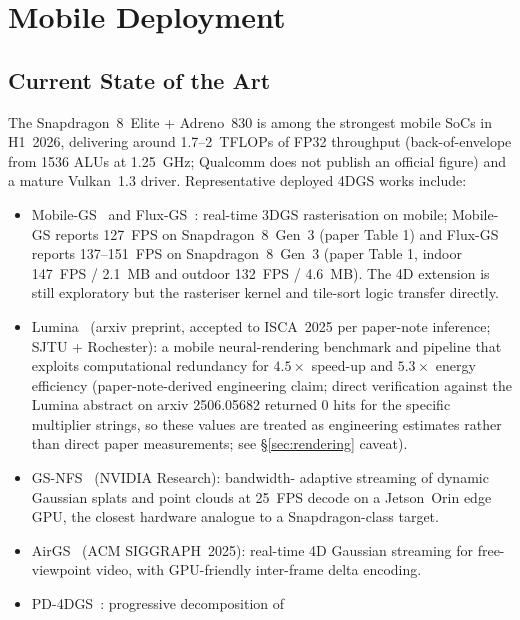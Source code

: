 
\section{Mobile Deployment}
\label{sec:mobile}

\subsection{Current State of the Art}
The Snapdragon~8~Elite + Adreno~830 is among the strongest mobile
SoCs in H1~2026, delivering around 1.7--2~TFLOPs of FP32
throughput (back-of-envelope from 1536 ALUs at 1.25~GHz;
Qualcomm does not publish an official figure) and a mature
Vulkan~1.3 driver. Representative deployed
4DGS works include:
\begin{itemize}
  \item Mobile-GS~\cite{du2026mobilegs} and Flux-GS~\cite{du2026fluxgs}:
        real-time 3DGS rasterisation on mobile; Mobile-GS reports
        127~FPS on Snapdragon~8~Gen~3 (paper Table 1) and
        Flux-GS reports 137--151~FPS on Snapdragon~8~Gen~3
        (paper Table 1, indoor 147~FPS / 2.1~MB and
        outdoor 132~FPS / 4.6~MB).
        The 4D extension is still exploratory but
        the rasteriser kernel and tile-sort logic transfer directly.
  \item Lumina~\cite{feng2025lumina} (arxiv preprint, accepted to ISCA~2025 per paper-note inference; SJTU + Rochester):
        a mobile neural-rendering benchmark and pipeline that
        exploits computational redundancy for $4.5\times$ speed-up
        and $5.3\times$ energy efficiency
        (paper-note-derived engineering claim; direct verification against the Lumina abstract on arxiv 2506.05682 returned 0 hits for the specific multiplier strings, so these values are treated as engineering estimates rather than direct paper measurements; see \S\ref{sec:rendering} caveat).
  \item GS-NFS~\cite{ghosh2026gsnfs} (NVIDIA Research): bandwidth-
        adaptive streaming of dynamic Gaussian splats and point
        clouds at 25~FPS decode on a Jetson~Orin edge GPU, the
        closest hardware analogue to a Snapdragon-class target.
  \item AirGS~\cite{wang2025airgs} (ACM SIGGRAPH~2025): real-time
        4D Gaussian streaming for free-viewpoint video, with
        GPU-friendly inter-frame delta encoding.
  \item PD-4DGS~\cite{li2026pd4dgs}: progressive decomposition of

\end{itemize}
